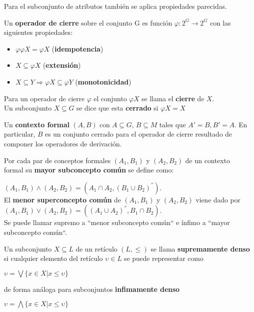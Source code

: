 \documentclass[../../main.tex]{subfiles}
\begin{document}
Para el subconjunto de atributos también se aplica propiedades parecidas.


\begin{definicion}
Un \textbf{operador de cierre} sobre el conjunto G es función $\varphi : 2^{G} \longrightarrow 2^{G}$ con las siguientes propiedades:
\begin{itemize}
    \item $\varphi \varphi X = \varphi X$ (\textbf{idempotencia})
    \item $X \subseteq \varphi X$ (\textbf{extensión})
    \item $X \subseteq Y \Longrightarrow \varphi X \subseteq \varphi Y$ (\textbf{monotonicidad})
\end{itemize}
\begin{center}
    Para un operador de cierre $\varphi$ el conjunto $\varphi X$ se llama el \textbf{cierre} de $X$. \\
    Un subconjunto $X \subseteq G$ se dice que esta \textbf{cerrado} si $\varphi X = X$
\end{center}
\end{definicion}


\begin{definicion}
Un \textbf{contexto formal} $(A, B)$ con $A\subseteq G$, $B\subseteq M$ tales que $A' = B, B' = A$. En particular, $B$ es un conjunto cerrado para el operador de cierre resultado de componer los operadores de derivación.
\end{definicion}


\begin{definicion}
Por cada par de conceptos formales $(A_1, B_1)$ y $(A_2, B_2)$ de un contexto formal su \textbf{mayor subconcepto común} se define como:
\begin{center}
    $(A_1, B_1) \wedge (A_2, B_2) = (A_1 \cap A_2, (B_1 \cup B_2)^{''}) $. \\
    El \textbf{menor superconcepto común} de $(A_1, B_1)$ y $(A_2, B_2)$ viene dado por \\
    $(A_1, B_1) \vee (A_2, B_2) = ((A_1 \cup A_2)^{''}, B_1 \cap B_2) $. \\
    Se puede llamar supremo a ``menor subconcepto común`` e ínfimo a ``mayor subconcepto común``.
\end{center}
\end{definicion}



\begin{definicion}
Un subconjunto $X \subseteq L$ de un retículo $(L, \leq)$ se llama \textbf{supremamente denso} si cualquier elemento del retículo $\upsilon \in L$ se puede representar como
\begin{center}
    $\upsilon = \bigvee \{ x \in X | x \leq \upsilon \}$
\end{center}
de forma análoga para subconjuntos \textbf{infimamente denso}
\begin{center}
    $\upsilon = \bigwedge \{ x \in X | x \leq \upsilon \}$
\end{center}
\end{definicion}

\end{document}
